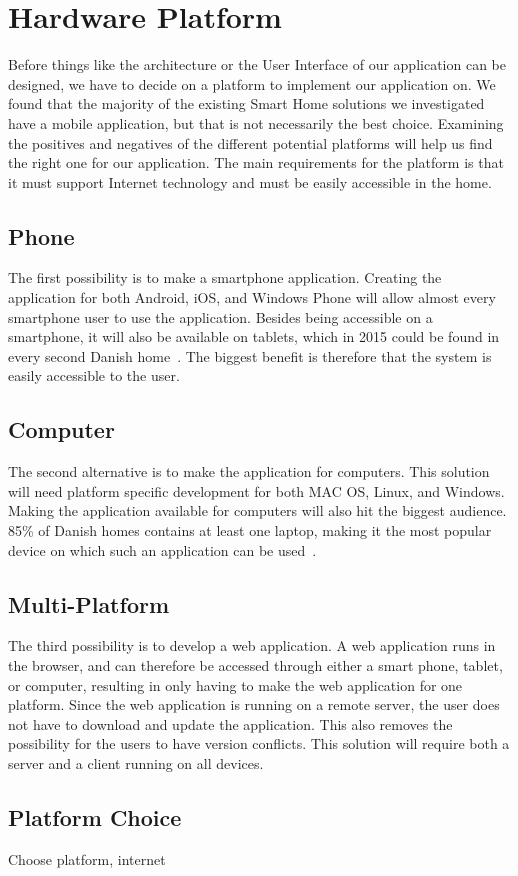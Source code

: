 \section{Hardware Platform} \label{sec:platform}
Before things like the architecture or the User Interface of our application can be designed, we have to decide on a platform to implement our application on. We found that the majority of the existing Smart Home solutions we investigated have a mobile application, but that is not necessarily the best choice. Examining the positives and negatives of the different potential platforms will help us find the right one for our application. The main requirements for the platform is that it must support Internet technology and must be easily accessible in the home.

\subsection{Phone}
The first possibility is to make a smartphone application. Creating the application for both Android, iOS, and Windows Phone will allow almost every smartphone user to use the application. Besides being accessible on a smartphone, it will also be available on tablets, which in 2015 could be found in every second Danish home~\citep{dst-elektronik}. The biggest benefit is therefore that the system is easily accessible to the user. 

\subsection{Computer}
The second alternative is to make the application for computers. This solution will need platform specific development for both MAC OS, Linux, and Windows. Making the application available for computers will also hit the biggest audience. 85\% of Danish homes contains at least one laptop, making it the most popular device on which such an application can be used~\citep{dst-elektronik}.

\subsection{Multi-Platform}
The third possibility is to develop a web application. A web application runs in the browser, and can therefore be accessed through either a smart phone, tablet, or computer, resulting in only having to make the web application for one platform. Since the web application is running on a remote server, the user does not have to download and update the application. This also removes the possibility for the users to have version conflicts. This solution will require both a server and a client running on all devices. 

\subsection{Platform Choice}
Choose platform, internet

